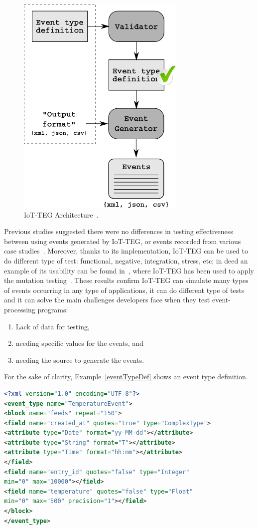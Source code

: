 \documentclass[review]{elsarticle}
\begin{document}
\begin{figure}[!ht]
	\centering
	\includegraphics[scale=0.7]{Images/IoT-EGArquitecture}
	\caption[IoT-TEG Architecture]{IoT-TEG Architecture~\cite{TesisGutierrez2017,Gutierrez2017}.}
	\label{fig:IoT-EGArquitecture}
\end{figure}
\newpage
Previous studies suggested there were no differences in testing effectiveness between using events
generated by IoT-TEG, or events recorded from various case studies~\cite{Gutierrez2017,TesisGutierrez2017}.
Moreover, thanks to its implementation, IoT-TEG can be used to do different type of test: functional,
negative, integration, stress, etc; in deed an example of its usability can be found 
in~\cite{TesisGutierrez2017,gutierrez2018}, where IoT-TEG has been used to apply the mutation 
testing~\cite{jia2011}. These results confirm IoT-TEG can 
simulate many types of events occurring in any type of applications, it can do different type of tests
and it can solve the main challenges developers face when they test event-processing programs:
\begin{enumerate}
	\item Lack of data for testing,
	\item needing specific values for the events, and
	\item needing the source to generate the events.
\end{enumerate}

For the sake of clarity, Example~\ref{eventTypeDef} shows an event type
definition.

\begin{lstlisting}[basicstyle=\ttfamily\footnotesize,language=XML,caption=Event type definition example,label=eventTypeDef]
<?xml version="1.0" encoding="UTF-8"?>
<event_type name="TemperatureEvent">
<block name="feeds" repeat="150">
<field name="created_at" quotes="true" type="ComplexType">
<attribute type="Date" format="yy-MM-dd"></attribute>
<attribute type="String" format="T"></attribute>
<attribute type="Time" format="hh:mm"></attribute>
</field>
<field name="entry_id" quotes="false" type="Integer" 
min="0" max="10000"></field>
<field name="temperature" quotes="false" type="Float" 
min="0" max="500" precision="1"></field>
</block>
</event_type>
\end{lstlisting}
\end{document}
